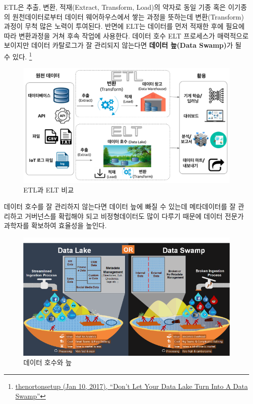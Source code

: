 \documentclass[
  letterpaper,
  chapter,a4paper,showtrims,openright,hidelinks]{oblivoir}
\begin{document}
ETL은 추출, 변환, 적재(Extract, Transform, Load)의 약자로 동일 기종 혹은
이기종의 원천데이터로부터 데이터 웨어하우스에서 쌓는 과정을 뜻하는데
변환(Transform) 과정이 무척 많은 노력이 투여된다. 반면에 ELT는 데이터를
먼저 적재한 후에 필요에 따라 변환과정을 거쳐 후속 작업에 사용한다.
데이터 호수 ELT 프로세스가 매력적으로 보이지만 데이터 카탈로그가 잘
관리되지 않는다면 \textbf{데이터 늪(Data Swamp)}가 될 수 있다.
\footnote{\href{https://medium.com/@thenortonsetup/dont-let-your-data-lake-turn-into-a-data-swamp-44dba717126b}{thenortonsetup
  (Jan 10, 2017), ``Don't Let Your Data Lake Turn Into A Data Swamp''}}

\begin{figure}

{\centering \includegraphics{images/databse_etl.png}

}

\caption{ETL과 ELT 비교}

\end{figure}

데이터 호수를 잘 관리하지 않는다면 데이터 늪에 빠질 수 있는데
메타데이터를 잘 관리하고 거버넌스를 확립해야 되고 비정형데이터도 많이
다루기 때문에 데이터 전문가 과학자를 확보하여 효율성을 높인다.

\begin{figure}

{\centering \includegraphics{images/database_swamp.png}

}

\caption{데이터 호수와 늪}

\end{figure}
\end{document}
